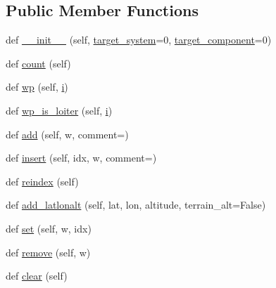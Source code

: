 \subsection*{Public Member Functions}
\begin{DoxyCompactItemize}
\item 
def \mbox{\hyperlink{classpymavlink_1_1mavwp_1_1MAVWPLoader_a08660f56f7e491e1a734f8157c5246de}{\+\_\+\+\_\+init\+\_\+\+\_\+}} (self, \mbox{\hyperlink{classpymavlink_1_1mavwp_1_1MAVWPLoader_ab2508eaf2dbcb542806555784f33d373}{target\+\_\+system}}=0, \mbox{\hyperlink{classpymavlink_1_1mavwp_1_1MAVWPLoader_a246f85ae9561c8f657f97849d59b2773}{target\+\_\+component}}=0)
\item 
def \mbox{\hyperlink{classpymavlink_1_1mavwp_1_1MAVWPLoader_ab38c2086b2274779f35762bf890f237c}{count}} (self)
\item 
def \mbox{\hyperlink{classpymavlink_1_1mavwp_1_1MAVWPLoader_a30cdf4df3d3797823d0137848800a204}{wp}} (self, \mbox{\hyperlink{velTest_8cpp_a1239420b8759f52cbab64225b82461e2}{i}})
\item 
def \mbox{\hyperlink{classpymavlink_1_1mavwp_1_1MAVWPLoader_a286be0ad910cb10799ddb7f16a04fb10}{wp\+\_\+is\+\_\+loiter}} (self, \mbox{\hyperlink{velTest_8cpp_a1239420b8759f52cbab64225b82461e2}{i}})
\item 
def \mbox{\hyperlink{classpymavlink_1_1mavwp_1_1MAVWPLoader_a32b224f0d31c036f92415dddeaa82b5d}{add}} (self, w, comment=\textquotesingle{}\textquotesingle{})
\item 
def \mbox{\hyperlink{classpymavlink_1_1mavwp_1_1MAVWPLoader_aa698fc16bd74560273b08b180b52c470}{insert}} (self, idx, w, comment=\textquotesingle{}\textquotesingle{})
\item 
def \mbox{\hyperlink{classpymavlink_1_1mavwp_1_1MAVWPLoader_aaaee4bf57d9c77b85ccc155439cacce2}{reindex}} (self)
\item 
def \mbox{\hyperlink{classpymavlink_1_1mavwp_1_1MAVWPLoader_a6e998a58eea829205e8c4c3cb75de107}{add\+\_\+latlonalt}} (self, lat, lon, altitude, terrain\+\_\+alt=False)
\item 
def \mbox{\hyperlink{classpymavlink_1_1mavwp_1_1MAVWPLoader_a7148099563199a32ccccb546115d4d24}{set}} (self, w, idx)
\item 
def \mbox{\hyperlink{classpymavlink_1_1mavwp_1_1MAVWPLoader_a2c039310e8284c9c86abd871be710dd1}{remove}} (self, w)
\item 
def \mbox{\hyperlink{classpymavlink_1_1mavwp_1_1MAVWPLoader_a292abb3c99ba217989fd7ea399d434de}{clear}} (self)
\item 

\end{DoxyCompactItemize}

